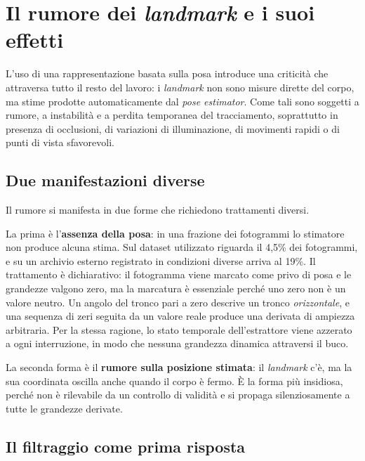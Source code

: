 
\section{Il rumore dei \emph{landmark} e i suoi effetti}
\label{sec:rumore}

L'uso di una rappresentazione basata sulla posa introduce una criticità che
attraversa tutto il resto del lavoro: i \emph{landmark} non sono misure dirette
del corpo, ma stime prodotte automaticamente dal \emph{pose estimator}. Come
tali sono soggetti a rumore, a instabilità e a perdita temporanea del
tracciamento, soprattutto in presenza di occlusioni, di variazioni di
illuminazione, di movimenti rapidi o di punti di vista sfavorevoli.

\subsection{Due manifestazioni diverse}

Il rumore si manifesta in due forme che richiedono trattamenti diversi.

La prima è l'\textbf{assenza della posa}: in una frazione dei fotogrammi lo
stimatore non produce alcuna stima. Sul dataset utilizzato riguarda il 4,5\%
dei fotogrammi, e su un archivio esterno registrato in condizioni diverse
arriva al 19\%. Il trattamento è dichiarativo: il fotogramma viene marcato come
privo di posa e le grandezze valgono zero, ma la marcatura è essenziale perché
uno zero non è un valore neutro. Un angolo del tronco pari a zero descrive un
tronco \emph{orizzontale}, e una sequenza di zeri seguita da un valore reale
produce una derivata di ampiezza arbitraria. Per la stessa ragione, lo stato
temporale dell'estrattore viene azzerato a ogni interruzione, in modo che
nessuna grandezza dinamica attraversi il buco.

La seconda forma è il \textbf{rumore sulla posizione stimata}: il
\emph{landmark} c'è, ma la sua coordinata oscilla anche quando il corpo è
fermo. È la forma più insidiosa, perché non è rilevabile da un controllo di
validità e si propaga silenziosamente a tutte le grandezze derivate.

\subsection{Il filtraggio come prima risposta}

